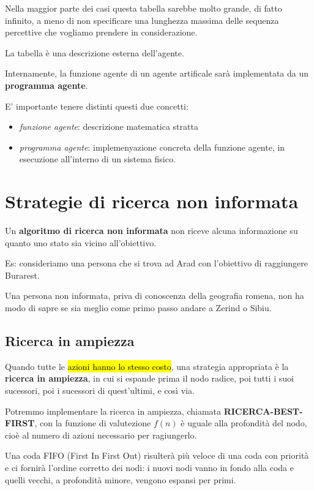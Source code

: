 \documentclass[a4paper, 12pt]{book}
\begin{document}
    Nella maggior parte dei casi questa tabella sarebbe molto grande, di fatto infinito, a meno di non specificare una lunghezza massima delle sequenza percettive che vogliamo prendere in considerazione.

    La tabella è una descrizione esterna dell'agente.

    Internamente, la funzione agente di un agente artificale sarà implementata da un \textbf{programma agente}.

    E' importante tenere distinti questi due concetti:
    \begin{itemize}
      \item \textit{funzione agente}: descrizione matematica stratta
      \item \textit{programma agente}: implemenyazione concreta della funzione agente, in esecuzione all'interno di un sistema fisico.
    \end{itemize}

    \section*{Strategie di ricerca non informata}
    Un \textbf{algoritmo di ricerca non informata} non riceve alcuna informazione su quanto uno stato sia vicino all'obiettivo.

    Es: consideriamo una persona che si trova ad Arad con l'obiettivo di raggiungere Burarest.

    Una persona non informata, priva di conoscenza della geografia romena, non ha modo di sapre se sia meglio come primo passo andare a Zerind o Sibiu.

    \subsection*{Ricerca in ampiezza}
    Quando tutte le \hl{azioni hanno lo stesso costo}, una strategia appropriata è la \textbf{ricerca in ampiezza}, in cui si espande prima il nodo radice, poi tutti i suoi sucessori, poi i sucessori di quest'ultimi, e così via.

    Potremmo implementare la ricerca in ampiezza, chiamata \textbf{RICERCA-BEST-FIRST}, con la funzione di valutezione $f(n)$ è uguale alla profondità del nodo, cioè al numero di azioni necessario per ragiungerlo.

    Una coda FIFO (First In First Out) risulterà più veloce di una coda con priorità e ci fornirà l'ordine corretto dei nodi: i nuovi nodi vanno in fondo alla coda e quelli vecchi, a profondità minore, vengono espansi per primi.
\end{document}
